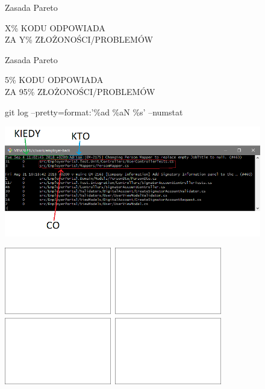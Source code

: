 \documentclass{beamer}
\begin{document}
\begin{frame}{Zasada Pareto}
\begin{center}
\Large{{\color{red}X\%} KODU ODPOWIADA\\
ZA {\color{red}Y\%} ZŁOŻONOŚCI/PROBLEMÓW}
\end{center}
\end{frame}

\begin{frame}{Zasada Pareto}
\begin{center}
\Large{{\color{red}5\%} KODU ODPOWIADA\\
ZA {\color{red}95\%} ZŁOŻONOŚCI/PROBLEMÓW}
\end{center}
\end{frame}

\begin{frame}{git log --pretty=format:'\%ad \%aN \%s' --numstat}
\begin{center}
  	\includegraphics[height=4.85cm]{git_log.png}
\end{center}
\end{frame}

\begin{frame}{}
\begin{center}
  	\includegraphics[height=6cm]{git_log1.png}
\end{center}
\end{frame}
\end{document}

